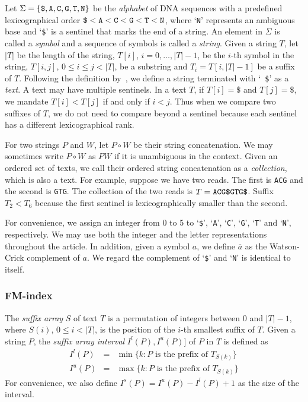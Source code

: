 \documentclass{bioinfo}
\begin{document}
\begin{methods}
Let $\Sigma=\{\mbox{\tt \$},\mbox{\tt A},\mbox{\tt C},\mbox{\tt G},\mbox{\tt
T},\mbox{\tt N}\}$ be the \emph{alphabet} of DNA sequences with a predefined
lexicographical order $\mbox{\tt \$}<\mbox{\tt A}<\mbox{\tt C}<\mbox{\tt
G}<\mbox{\tt T}<\mbox{\tt N}$, where `{\tt N}' represents an ambiguous base and
`{\tt \$}' is a sentinel that marks the end of a string. An element in $\Sigma$
is called a \emph{symbol} and a sequence of symbols is called a \emph{string}.
Given a string $T$, let $|T|$ be the length of the string, $T[i]$,
$i=0,\ldots,|T|-1$, be the $i$-th symbol in the string, $T[i,j]$, $0\le i\le
j<|T|$, be a substring and $T_i=T[i,|T|-1]$ be a suffix of $T$. Following
the definition by~\citet{en:2009fk}, we define a string terminated with `{\tt
\$}' as a \emph{text}. A text may have multiple sentinels. In a text $T$, if
$T[i]=\$$ and $T[j]=\$$, we mandate $T[i]<T[j]$ if and only if $i<j$. Thus when
we compare two suffixes of $T$, we do not need to compare beyond a sentinel
because each sentinel has a different lexicographical rank.

For two strings $P$ and $W$, let $P\circ W$ be their string concatenation.
We may sometimes write $P\circ W$ as $PW$ if it is unambiguous in the context.
Given an ordered set of texts, we call their ordered string concatenation
as a \emph{collection}, which is also a text. For example, suppose we have
two reads. The first is {\tt ACG} and the second is {\tt GTG}. The collection
of the two reads is $T=\mbox{\tt ACG\$GTG\$}$. Suffix $T_2<T_6$ because the first
sentinel is lexicographically smaller than the second.

For convenience, we assign an integer from 0 to 5 to `{\tt \$}', `{\tt A}',
`{\tt C}', `{\tt G}', `{\tt T}' and `{\tt N}', respectively. We may use both
the integer and the letter representations throughout the article. In addition,
given a symbol $a$, we define $\overline{a}$ as the Watson-Crick complement of $a$.
We regard the complement of `{\tt \$}' and `{\tt N}' is identical to itself.

\subsubsection{FM-index}

The \emph{suffix array} $S$ of text $T$ is a permutation of integers between 0 and
$|T|-1$, where $S(i)$, $0\le i<|T|$, is the position of the $i$-th smallest
suffix of $T$. Given a string $P$, the \emph{suffix array interval}
$I^l(P),I^u(P)]$ of $P$ in $T$ is defined as
\begin{eqnarray*}
I^l(P)&=&\min\{k:\mbox{$P$ is the prefix of $T_{S(k)}$}\}\\
I^u(P) &=&\max\{k:\mbox{$P$ is the prefix of $T_{S(k)}$}\}
\end{eqnarray*}
For convenience, we also define $I^s(P)=I^u(P)-I^l(P)+1$ as the size of the interval.


\end{methods}
\end{document}
